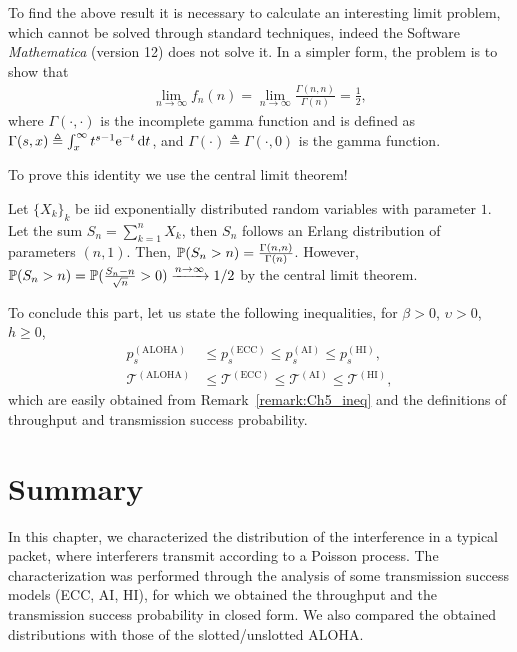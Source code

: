 \begin{note}
    To find the above result it is necessary to calculate an interesting limit problem, which cannot be solved through standard techniques, indeed the Software \textit{Mathematica} (version 12) does not solve it. In a simpler form, the problem is to show that
    \begin{align*}
        \lim_{n\to\infty} f_n(n) = \lim_{n\to\infty} \frac{\Gamma(n,n)}{\Gamma(n)} = \frac{1}{2},
    \end{align*}
    where $\Gamma(\cdot,\cdot)$ is the incomplete gamma function and is defined as $\Gamma(s,x)\triangleq \int_{x}^\infty t^{s-1} \euler^{-t}\,\d t$, and $\Gamma(\cdot) \triangleq \Gamma(\cdot,0)$ is the gamma function.
    
    To prove this identity we use the central limit theorem!
    
    Let $\{X_k\}_k$ be iid exponentially distributed random variables with parameter $1$. Let the sum $S_n = \sum_{k=1}^n X_k$, then $S_n$ follows an Erlang distribution of parameters $(n,1)$. Then, $\P(S_n > n) = \frac{\Gamma(n,n)}{\Gamma(n)}$. However, $\P(S_n > n) = \P(\frac{S_n-n}{\sqrt{n}} > 0) \xrightarrow{n\to\infty} 1/2$ by the central limit theorem.
\end{note}

To conclude this part, let us state the following inequalities, for $\beta > 0$, $\upsilon > 0$, $h\ge 0$,
\begin{align*}
    p_s^{\mathrm{(ALOHA)}} &\le p_s^{\mathrm{(ECC)}} \le p_s^{\mathrm{(AI)}} \le p_s^{\mathrm{(HI)}},\\
    \mathscr{T}^{\mathrm{(ALOHA)}} &\le \mathscr{T}^{\mathrm{(ECC)}} \le \mathscr{T}^{\mathrm{(AI)}} \le \mathscr{T}^{\mathrm{(HI)}},
\end{align*}
which are easily obtained from Remark~\ref{remark:Ch5_ineq} and the definitions of throughput and transmission success probability.

\section{Summary} \label{sec:summ_P2_01}

In this chapter, we characterized the distribution of the interference in a typical packet, where interferers transmit according to a Poisson process.
%
The characterization was performed through the analysis of some transmission success models (ECC, AI, HI), for which we obtained the throughput and the transmission success probability in closed form.
%
We also compared the obtained distributions with those of the slotted/unslotted ALOHA.
